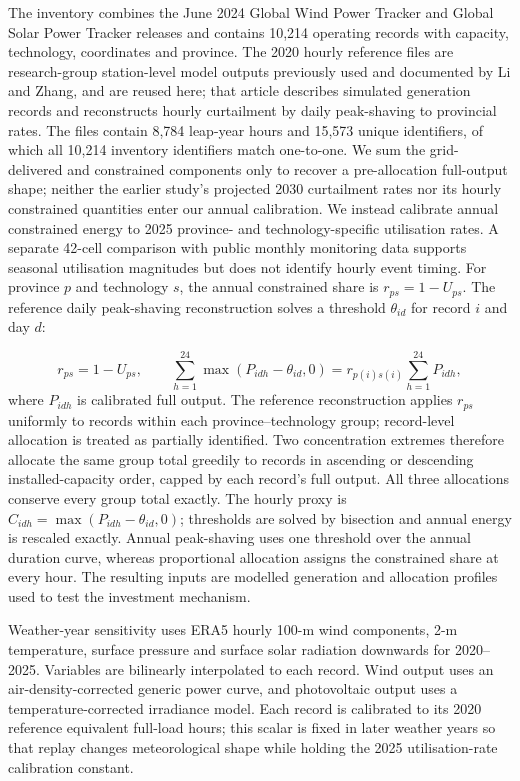 \documentclass[11pt,a4paper]{article}
\begin{document}
The inventory combines the June 2024 Global Wind Power Tracker and Global Solar Power Tracker releases and contains 10,214 operating records with capacity, technology, coordinates and province\cite{gem2024}. The 2020 hourly reference files are research-group station-level model outputs previously used and documented by Li and Zhang\cite{li2026}, and are reused here; that article describes simulated generation records and reconstructs hourly curtailment by daily peak-shaving to provincial rates. The files contain 8,784 leap-year hours and 15,573 unique identifiers, of which all 10,214 inventory identifiers match one-to-one. We sum the grid-delivered and constrained components only to recover a pre-allocation full-output shape; neither the earlier study's projected 2030 curtailment rates nor its hourly constrained quantities enter our annual calibration. We instead calibrate annual constrained energy to 2025 province- and technology-specific utilisation rates\cite{renewable2025}. A separate 42-cell comparison with public monthly monitoring data supports seasonal utilisation magnitudes but does not identify hourly event timing\cite{renewablemonthly}. For province $p$ and technology $s$, the annual constrained share is $r_{ps}=1-U_{ps}$. The reference daily peak-shaving reconstruction solves a threshold $\theta_{id}$ for record $i$ and day $d$:

\begin{equation}
r_{ps}=1-U_{ps}, \qquad
\sum_{h=1}^{24}\max\!\left(P_{idh}-\theta_{id},0\right)
=r_{p(i)s(i)}\sum_{h=1}^{24}P_{idh},
\label{eq:curtailment}
\end{equation}
where $P_{idh}$ is calibrated full output. The reference reconstruction applies $r_{ps}$ uniformly to records within each province--technology group; record-level allocation is treated as partially identified. Two concentration extremes therefore allocate the same group total greedily to records in ascending or descending installed-capacity order, capped by each record's full output. All three allocations conserve every group total exactly. The hourly proxy is $C_{idh}=\max(P_{idh}-\theta_{id},0)$; thresholds are solved by bisection and annual energy is rescaled exactly. Annual peak-shaving uses one threshold over the annual duration curve, whereas proportional allocation assigns the constrained share at every hour. The resulting inputs are modelled generation and allocation profiles used to test the investment mechanism.

Weather-year sensitivity uses ERA5 hourly 100-m wind components, 2-m temperature, surface pressure and surface solar radiation downwards for 2020--2025\cite{hersbach2020,era5data}. Variables are bilinearly interpolated to each record. Wind output uses an air-density-corrected generic power curve, and photovoltaic output uses a temperature-corrected irradiance model. Each record is calibrated to its 2020 reference equivalent full-load hours; this scalar is fixed in later weather years so that replay changes meteorological shape while holding the 2025 utilisation-rate calibration constant.
\end{document}
